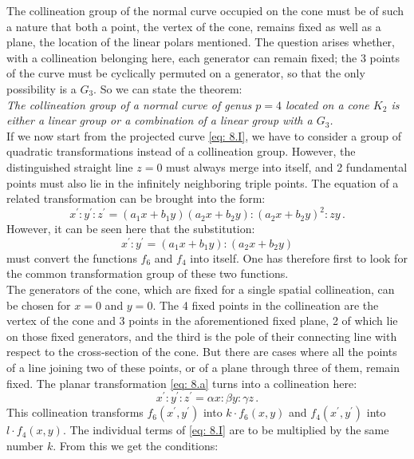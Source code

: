 \documentclass[leqno]{article}
\begin{document}
The collineation group of the normal curve occupied on the cone must be of such a nature that both a point, the vertex of the cone, remains fixed as well as a plane, the location of the linear polars mentioned. The question arises whether, with a collineation belonging here, each generator can remain fixed; the 3 points of the curve must be cyclically permuted on a generator, so that the only possibility is a $G_3$. So we can state the theorem: \\
\textit{The collineation group of a normal curve of genus $p=4$ located on a cone $K_2$ is either a linear group or a combination of a linear group with a $G_3$.} \\
If we now start from the projected curve \eqref{eq: 8.I}, we have to consider a group of quadratic transformations instead of a collineation group. However, the distinguished straight line $z=0$ must always merge into itself, and 2 fundamental points must also lie in the infinitely neighboring triple points. The equation of a related transformation can be brought into the form:
\begin{equation}\label{eq: 8.a}
x^\prime : y^\prime : z^\prime = (a_1 x + b_1 y) (a_2 x + b_2 y) : (a_2 x + b_2 y)^2 : zy \, . \tag{a}
\end{equation}
However, it can be seen here that the substitution: 
\[
x^\prime : y^\prime = (a_1 x + b_1 y) : (a_2 x + b_2 y)
\] 
must convert the functions $f_6$ and $f_4$ into itself. One has therefore first to look for the common transformation group of these two functions. \\
The generators of the cone, which are fixed for a single spatial collineation, can be chosen for $x=0$ and $y=0$. The 4 fixed points in the collineation are the vertex of the cone and 3 points in the aforementioned fixed plane, 2 of which lie on those fixed generators, and the third is the pole of their connecting line with respect to the cross-section of the cone. But there are cases where all the points of a line joining two of these points, or of a plane through three of them, remain fixed. The planar transformation \eqref{eq: 8.a} turns into a collineation here:
\begin{equation}\label{eq: 8.aprime}
x^\prime : y^\prime : z^\prime = \alpha x : \beta y : \gamma z \, . \tag{$a^\prime$}
\end{equation}
This collineation transforms $f_6(x^\prime, y^\prime)$ into $k \cdot f_6(x, y)$ and $f_4(x^\prime, y^\prime)$ into $l \cdot f_4(x,y)$. The individual terms of \eqref{eq: 8.I} are to be multiplied by the same number $k$. From this we get the conditions:
\end{document}
